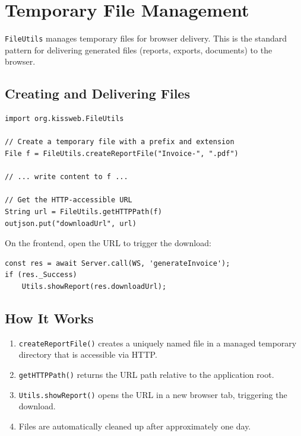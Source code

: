 \section{Temporary File Management}
\label{sec:file-delivery}

\texttt{FileUtils} manages temporary files for browser delivery.  This is the standard pattern for delivering generated files (reports, exports, documents) to the browser.

\subsection{Creating and Delivering Files}

\begin{lstlisting}[style=groovy]
import org.kissweb.FileUtils

// Create a temporary file with a prefix and extension
File f = FileUtils.createReportFile("Invoice-", ".pdf")

// ... write content to f ...

// Get the HTTP-accessible URL
String url = FileUtils.getHTTPPath(f)
outjson.put("downloadUrl", url)
\end{lstlisting}

\noindent
On the frontend, open the URL to trigger the download:

\begin{lstlisting}[style=javascript]
const res = await Server.call(WS, 'generateInvoice');
if (res._Success)
    Utils.showReport(res.downloadUrl);
\end{lstlisting}

\subsection{How It Works}

\begin{enumerate}
  \item \texttt{createReportFile()} creates a uniquely named file in a managed temporary directory that is accessible via HTTP.
  \item \texttt{getHTTPPath()} returns the URL path relative to the application root.
  \item \texttt{Utils.showReport()} opens the URL in a new browser tab, triggering the download.
  \item Files are automatically cleaned up after approximately one day.
\end{enumerate}

